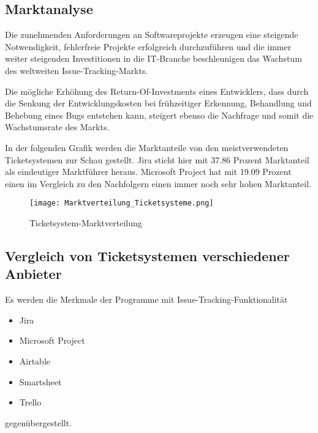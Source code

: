 \subsection{Marktanalyse}  
Die zunehmenden Anforderungen an Softwareprojekte erzeugen eine steigende Notwendigkeit, fehlerfreie Projekte erfolgreich durchzuführen und die immer weiter steigenden Investitionen in die IT-Branche beschleunigen das Wachstum des weltweiten Issue-Tracking-Markts.

Die mögliche Erhöhung des Return-Of-Investments eines Entwicklers, dass durch die Senkung der Entwicklungskosten bei frühzeitiger Erkennung, Behandlung und Behebung eines Bugs entstehen kann, steigert ebenso die Nachfrage und somit die Wachstumsrate des Markts.

In der folgenden Grafik werden die Marktanteile von den meistverwendeten Ticketsystemen zur Schau gestellt.
Jira sticht hier mit 37.86 Prozent Marktanteil als eindeutiger Marktführer heraus. Microsoft Project hat mit 19.09 Prozent einen im Vergleich zu den Nachfolgern einen immer noch sehr hohen Marktanteil.
\begin{figure}[H]
 	\centering
    \texttt{[image: Marktverteilung\_Ticketsysteme.png]}
	\caption{Ticketsystem-Marktverteilung}
\end{figure}   
\subsection{Vergleich von Ticketsystemen verschiedener Anbieter}
Es werden die Merkmale der Programme mit Issue-Tracking-Funktionalität
		\begin{itemize}
			\item Jira
			\item Microsoft Project
			\item Airtable
			\item Smartsheet
			\item Trello
		\end{itemize}
gegenübergestellt.   
